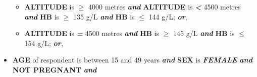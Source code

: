 \documentclass[12pt,a4paper]{article}
\begin{document}
\begin{itemize}
\begin{itemize}
  \item
    \textbf{ALTITUDE} is \textbf{\emph{\(\geq\)}} 4000 metres \textbf{\emph{and}} \textbf{ALTITUDE} is \textbf{\emph{\textless{}}} 4500 metres \textbf{\emph{and}} \textbf{HB} is \textbf{\emph{\(\geq\)}} 135 g/L \textbf{\emph{and}} \textbf{HB} is \textbf{\emph{\(\leq\)}} 144 g/L; \textbf{\emph{or}},
  \item
    \textbf{ALTITUDE} is \textbf{\emph{=}} 4500 metres \textbf{\emph{and}} \textbf{HB} is \textbf{\emph{\(\geq\)}} 145 g/L \textbf{\emph{and}} \textbf{HB} is \textbf{\emph{\(\leq\)}} 154 g/L; \textbf{\emph{or}},
  \end{itemize}
\item
  \textbf{AGE} of respondent is between 15 and 49 years \textbf{\emph{and}} \textbf{SEX} is \textbf{\emph{FEMALE}} \textbf{\emph{and}} \textbf{NOT PREGNANT} \textbf{\emph{and}}


\end{itemize}
\end{document}
